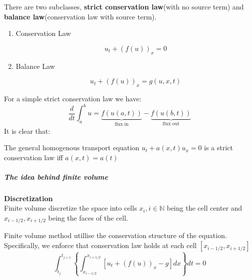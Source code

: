 \begin{definition}There are two subclasses, \textbf{strict conservation law}(with no source term) and \textbf{balance law}(conservation law with source term).

\begin{enumerate}
\item Conservation Law

\begin{equation}
u_t + (f(u))_x = 0
\end{equation}


\item Balance Law

\begin{equation}
u_t + (f(u))_x = g(u,x,t)
\end{equation}
\end{enumerate}

\end{definition}For a simple strict conservation law we have:
\begin{equation}
\frac{d}{dt}\int_a^b u = \underbrace{f(u(a,t))}_{\text{flux in}}-\underbrace{f(u(b,t))}_{\text{flux out}}
\end{equation}
It is clear that:

\begin{proposition}The general homogenous transport equation $u_t+a(x,t)u_x=0$ is a strict conservation law iff $a(x,t)=a(t)$

\end{proposition}\subparagraph{The idea behind finite volume}

\begin{framed}
\textbf{Discretization}\\
Finite volume discretize the space into cells $x_i, i\in \mathbb{N}$ being the cell center and $x_{i -1/2},x_{i+1/2}$ being the faces of the cell.
\end{framed}

Finite volume method utillise the conservation structure of the equation. Specifically, we enforce that conservation law holds at each cell $[x_{i -1/2},x_{i+1/2}]$\newline
\begin{equation}
\int_{t_j}^{t_{j+1}}\left\{ \int_{x_{i-1/2}}^{x_{i+1/2}} \left[ u_t + (f(u))_x -g\right]dx \right\}dt=0
\end{equation}